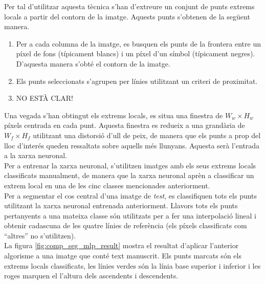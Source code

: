 Per tal d'utilitzar aquesta tècnica s'han d'extreure un conjunt de punts extrems locals a partir del contorn de la imatge. Aquests punts s'obtenen de la següent manera.
\begin{enumerate}
\item Per a cada columna de la imatge, es busquen els punts de la frontera entre un píxel de fons (típicament blancs) i un píxel d'un símbol (típicament negres). D'aquesta manera s'obté el contorn de la imatge.
\item Els punts seleccionats s'agrupen per línies utilitzant un criteri de proximitat.
\item NO ESTÀ CLAR!
\end{enumerate}

Una vegada s'han obtingut els extrems locals, es situa una finestra de $W_w \times H_w$ píxels centrada en cada punt. Aquesta finestra es redueix a una grandària de $W_f \times H_f$ utilitzant una distorsió d'ull de peix, de manera que els punts a prop del lloc d'interés queden ressaltats sobre aquells més llunyans. Aquesta serà l'entrada a la xarxa neuronal.\\

Per a entrenar la xarxa neuronal, s'utilitzen imatges amb els seus extrems locals classificats manualment, de manera que la xarxa neuronal aprèn a classificar un extrem local en una de les cinc classes mencionades anteriorment.\\

Per a segmentar el cos central d'una imatge de \emph{test}, es classifiquen tots els punts utilitzant la xarxa neuronal entrenada anteriorment. Llavors tots els punts pertanyents a una mateixa classe són utilitzats per a fer una interpolació lineal i obtenir cadascuna de les quatre línies de referència (els píxels classificats com ``altres'' no s'utilitzen).\\

La figura \ref{fig:comp_seg_mlp_result} mostra el resultat d'aplicar l'anterior algorisme a una imatge que conté text manuscrit. Els punts marcats són els extrems locals classificats, les línies verdes són la línia base superior i inferior i les roges marquen el l'altura dels ascendents i descendents.\\

